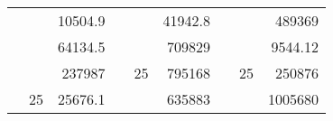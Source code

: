 \begin{table}[H]
\begin{tabular}{|ccrccrccc}
\rowcolor[HTML]{DAE8FC} 
\multicolumn{1}{|c|}{\cellcolor[HTML]{FFFFC7}}                                & \multicolumn{1}{c|}{\cellcolor[HTML]{DAE8FC}}                      & \multicolumn{1}{r|}{\cellcolor[HTML]{DAE8FC}10504.9}   & \multicolumn{1}{c|}{\cellcolor[HTML]{FFFFC7}}                                & \multicolumn{1}{c|}{\cellcolor[HTML]{DAE8FC}}                       & \multicolumn{1}{r|}{\cellcolor[HTML]{DAE8FC}41942.8}   & \multicolumn{1}{c|}{\cellcolor[HTML]{FFFFC7}}                                & \multicolumn{1}{c|}{\cellcolor[HTML]{DAE8FC}}                      & \multicolumn{1}{r|}{\cellcolor[HTML]{DAE8FC}489369}    \\ \cline{3-3} \cline{6-6} \cline{9-9} 
\multicolumn{1}{|c|}{\cellcolor[HTML]{FFFFC7}}                                & \multicolumn{1}{c|}{\cellcolor[HTML]{DAE8FC}}                      & \multicolumn{1}{r|}{\cellcolor[HTML]{DDFDFF}64134.5}   & \multicolumn{1}{c|}{\cellcolor[HTML]{FFFFC7}}                                & \multicolumn{1}{c|}{\cellcolor[HTML]{DAE8FC}}                       & \multicolumn{1}{r|}{\cellcolor[HTML]{DDFDFF}709829}    & \multicolumn{1}{c|}{\cellcolor[HTML]{FFFFC7}}                                & \multicolumn{1}{c|}{\cellcolor[HTML]{DAE8FC}}                      & \multicolumn{1}{r|}{\cellcolor[HTML]{DDFDFF}9544.12}   \\ \cline{3-3} \cline{6-6} \cline{9-9} 
\rowcolor[HTML]{DAE8FC} 
\multicolumn{1}{|c|}{\cellcolor[HTML]{FFFFC7}}                                & \multicolumn{1}{c|}{\cellcolor[HTML]{DAE8FC}}                      & \multicolumn{1}{r|}{\cellcolor[HTML]{DAE8FC}237987}    & \multicolumn{1}{c|}{\cellcolor[HTML]{FFFFC7}}                                & \multicolumn{1}{c|}{\multirow{-9}{*}{\cellcolor[HTML]{DAE8FC}25}}   & \multicolumn{1}{r|}{\cellcolor[HTML]{DAE8FC}795168}    & \multicolumn{1}{c|}{\cellcolor[HTML]{FFFFC7}}                                & \multicolumn{1}{c|}{\multirow{-9}{*}{\cellcolor[HTML]{DAE8FC}25}}  & \multicolumn{1}{r|}{\cellcolor[HTML]{DAE8FC}250876}    \\ \cline{3-3} \cline{5-6} \cline{8-9} 
\multicolumn{1}{|c|}{\cellcolor[HTML]{FFFFC7}}                                & \multicolumn{1}{c|}{\multirow{-10}{*}{\cellcolor[HTML]{DAE8FC}25}} & \multicolumn{1}{r|}{\cellcolor[HTML]{DDFDFF}25676.1}   & \multicolumn{1}{c|}{\cellcolor[HTML]{FFFFC7}}                                & \multicolumn{1}{c|}{\cellcolor[HTML]{DDFDFF}}                       & \multicolumn{1}{r|}{\cellcolor[HTML]{DAE8FC}635883}    & \multicolumn{1}{c|}{\cellcolor[HTML]{FFFFC7}}                                & \multicolumn{1}{c|}{\cellcolor[HTML]{DDFDFF}}                      & \multicolumn{1}{r|}{\cellcolor[HTML]{DAE8FC}1005680}   \\ \cline{2-3} \cline{6-6} \cline{9-9} 

\end{tabular}
\end{table}
